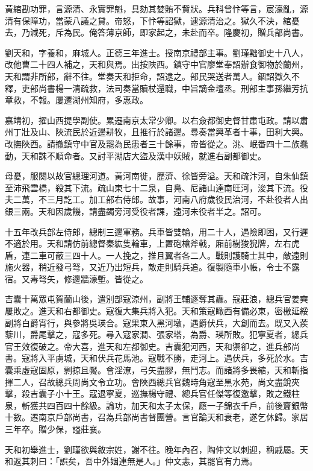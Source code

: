 \begin{pinyinscope}
黃綰勘功罪，言源清、永實罪魁，具劾其婪賄不貲狀。兵科曾忭等言，宸濠亂，源清有保障功，當蒙八議之貸。帝怒，下忭等詔獄，逮源清治之。獄久不決，綰憂去，乃減死，斥為民。俺答薄京師，即家起之，未赴而卒。隆慶初，贈兵部尚書。

劉天和，字養和，麻城人。正德三年進士。授南京禮部主事。劉瑾黜御史十八人，改他曹二十四人補之，天和與焉。出按陜西。鎮守中官廖堂奉詔辦食御物於蘭州，天和謂非所部，辭不往。堂奏天和拒命，詔逮之。部民哭送者萬人。錮詔獄久不釋，吏部尚書楊一清疏救，法司奏當贖杖還職，中旨謫金壇丞。刑部主事孫繼芳抗章救，不報。屢遷湖州知府，多惠政。

嘉靖初，擢山西提學副使。累遷南京太常少卿。以右僉都御史督甘肅屯政。請以肅州丁壯及山、陜流民於近邊耕牧，且推行於諸邊。尋奏當興革者十事，田利大興。改撫陜西。請撤鎮守中官及罷為民患者三十餘事，帝皆從之。洮、岷番四十二族蠢動，天和誅不順命者。又討平湖店大盜及漢中妖賊，就進右副都御史。

母憂，服闋以故官總理河道。黃河南徙，歷濟、徐皆旁溢。天和疏汴河，自朱仙鎮至沛飛雲橋，殺其下流。疏山東七十二泉，自鳧、尼諸山達南旺河，浚其下流。役夫二萬，不三月訖工。加工部右侍郎。故事，河南八府歲役民治河，不赴役者人出銀三兩。天和因歲饑，請盡蠲旁河受役者課，遠河未役者半之。詔可。

十五年改兵部左侍郎，總制三邊軍務。兵車皆雙輪，用二十人，遇險即困，又行遲不適於用。天和請仿前總督秦紘隻輪車，上置砲槍斧戟，廂前樹狻猊牌，左右虎盾，連二車可蔽三四十人。一人挽之，推且翼者各二人。戰則護騎士其中，敵遠則施火器，稍近發弓弩，又近乃出短兵，敵走則騎兵追。復製隨車小帳，令士不露宿。又毒弩矢，修邊牆濠塹。皆從之。

吉囊十萬眾屯賀蘭山後，遣別部寇涼州，副將王輔逐奪其纛。寇莊浪，總兵官姜奭屢敗之。進天和右都御史。寇復大集兵將入犯。天和策寇瞰西有備必東，密檄延綏副將白爵宵行，與參將吳瑛合。寇果東入黑河墩，遇爵伏兵，大創而去。既又入蒺藜川，爵尾擊之，寇多死。尋入寇家澗、張家塔，為爵、瑛所敗。犯寧夏者，總兵官王效復破之。帝大喜，進天和左都御史。吉囊犯河西，天和禦卻之，進兵部尚書。寇將入平虜城，天和伏兵花馬池。寇戰不勝，走河上。遇伏兵，多死於水。吉囊乘虛寇固原，剽掠且饜。會淫潦，弓矢盡膠，無鬥志。而諸將多畏縮，天和斬指揮二人，召故總兵周尚文令立功。會陜西總兵官魏時角寇至黑水苑，尚文盡銳夾擊，殺吉囊子小十王。寇退寧夏，巡撫楊守禮、總兵官任傑等復邀擊，敗之鐵柱泉，斬獲共四百四十餘級。論功，加天和太子太保，廕一子錦衣千戶，前後齎銀幣十數。遷南京戶部尚書，召為兵部尚書督團營。言官論天和衰老，遂乞休歸。家居三年卒。贈少保，謚莊襄。

天和初舉進士，劉瑾欲與敘宗姓，謝不往。晚年內召，陶仲文以刺迎，稱戚屬。天和返其刺曰：「誤矣，吾中外姻連無是人。」仲文恚，其罷官有力焉。


\end{pinyinscope}
